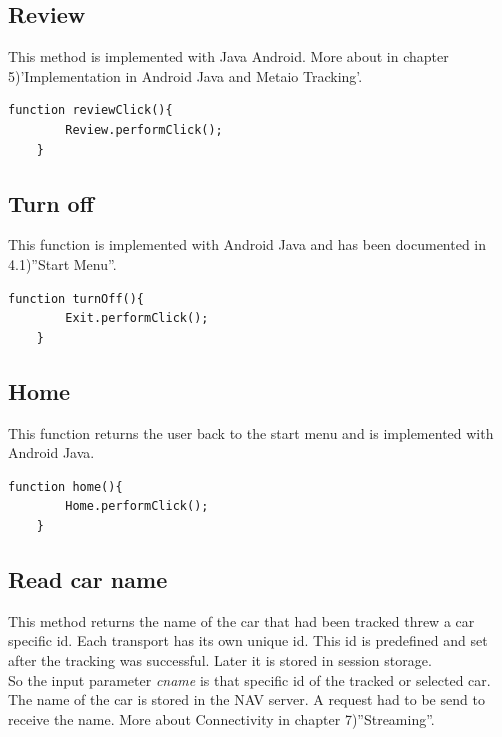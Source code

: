 \subsection{Review}
This method is implemented with Java Android. More about in chapter 5)'Implementation in Android Java and Metaio Tracking'.
\\

\begin{lstlisting}[language=html, caption= 
Review function,captionpos=b]
function reviewClick(){
        Review.performClick();
    }
\end{lstlisting}

\subsection{Turn off}
This function is implemented with Android Java and has been documented in 4.1)''Start Menu''.
\\

\begin{lstlisting}[language=html, caption= 
Turn off funtion,captionpos=b]
function turnOff(){
        Exit.performClick();
    }
\end{lstlisting}

\newpage
\subsection{Home}
This function returns the user back to the start menu and is implemented with Android Java.\\

\begin{lstlisting}[language=html, caption= 
Home function,captionpos=b]
function home(){
        Home.performClick();
    }
\end{lstlisting}


\subsection{Read car name}
This method returns the name of the car that had been tracked threw a car specific id. Each transport has its own unique id. This id is predefined and set after the tracking was successful. Later it is stored in session storage.
\\
\newline  
So the input parameter \textit{cname} is that specific id of the tracked or selected car. The name of the car is stored in the NAV server. A request had to be send to receive the name. More about Connectivity in chapter 7)''Streaming''.
\\


